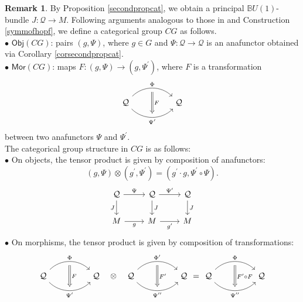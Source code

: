 \documentclass{article}
\theoremstyle{plain}
\theoremstyle{definition}
\newtheorem{rem}[thm]{Remark}
\begin{document}
\begin{rem}\label{hopesecondpropproof}
By Proposition \ref{secondpropcat}, we obtain a principal $\mathbb{B}U(1)$-bundle $J:\mathcal{Q} \longrightarrow M$. Following arguments analogous to those in \cite[Propositions 4.4.2 on page 47 and 4.5.3 on page 52]{MR900587} and Construction \ref{symmofhopf}, we define a categorical group $CG$ as follows. \\
$\bullet$ $\mathsf{Obj}(CG)$: pairs $(g,\Psi)$, where $g \in G$ and $\Psi:\mathcal{Q} \longrightarrow \mathcal{Q}$ is an anafunctor obtained via Corollary \ref{corsecondpropcat}. \\
$\bullet$ $\mathsf{Mor}(CG)$: maps $F:(g,\Psi) \longrightarrow (g,\Psi^\prime)$, where $F$ is a transformation
\[
\begin{tikzcd}
\mathcal{Q} \arrow[rr,bend left=45,"\Phi",""{name=u1,below}] \arrow[rr,bend right=45,"\Psi^\prime"',""{name=u2,above}] \arrow[Rightarrow,from=u1,to=u2,"F"] & & \mathcal{Q}
\end{tikzcd}
\]
between two anafunctors $\Psi$ and $\Psi^\prime$. \\
The categorical group structure in $CG$ is as follows: \\
$\bullet$ On objects, the tensor product is given by composition of anafunctors:
\[
(g,\Psi) \otimes (g^\prime,\Psi^\prime) = (g^\prime \cdot g,\Psi^\prime \circ \Psi).
\]
\[
\begin{tikzcd}
\mathcal{Q} \arrow[r,"\Psi"] \arrow[d,"J"'] & \mathcal{Q} \arrow[r,"\Psi^\prime"] \arrow[d,"J"] & \mathcal{Q} \arrow[d,"J"] \\
M \arrow[r,"g"'] & M \arrow[r,"{g^\prime}"'] & M
\end{tikzcd}
\]
$\bullet$ On morphisms, the tensor product is given by composition of transformations:
\[
\begin{tikzcd}
\mathcal{Q} \arrow[rr,bend left=45,"\Phi",""{name=u1,below}] \arrow[rr,bend right=45,"\Psi^\prime"',""{name=u2,above}] \arrow[Rightarrow,from=u1,to=u2,"F"] & & \mathcal{Q}
\end{tikzcd} ~~ \otimes ~~
\begin{tikzcd}
\mathcal{Q} \arrow[rr,bend left=45,"\Phi^\prime",""{name=u1,below}] \arrow[rr,bend right=45,"\Psi^{\prime\prime}"',""{name=u2,above}] \arrow[Rightarrow,from=u1,to=u2,"F^\prime"] & & \mathcal{Q}
\end{tikzcd} =
\begin{tikzcd}
\mathcal{Q} \arrow[rr,bend left=45,"\Phi",""{name=u1,below}] \arrow[rr,bend right=45,"\Psi^{\prime\prime}"',""{name=u2,above}] \arrow[Rightarrow,from=u1,to=u2,"F^\prime \circ F"] & & \mathcal{Q}

\end{tikzcd}\]
\end{rem}
\end{document}
